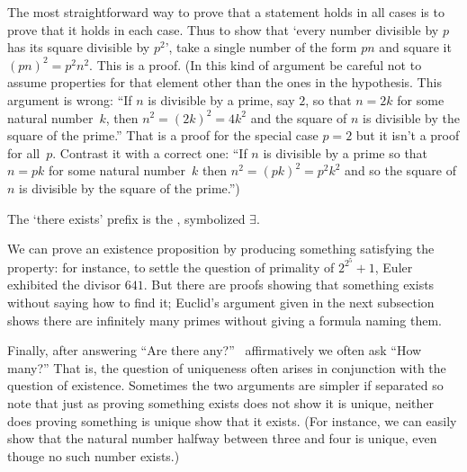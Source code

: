 The most straightforward way to prove that 
a statement holds in all cases is to 
prove that it holds in each case.
Thus to show that `every number divisible by \( p \) has its
square divisible by \( p^2 \)', take a single number of the form
\( pn \) and square it \( (pn)^2=p^2n^2 \).
This is a  proof.
(In this kind of argument be careful not to assume 
properties for that element
other than the ones in the hypothesis.
This argument is wrong:
``If \( n \) is divisible by a prime, say \( 2 \), so that \( n=2k \)
for some natural number~$k$,
then \( n^2=(2k)^2=4k^2 \) and the square of $n$ is divisible
by the square of the prime.''
That is a proof for the special case \( p=2 \) 
but it isn't a proof for all~\( p \).
Contrast it with a correct one:
``If \( n \) is divisible by a prime
so that \( n=pk \) for some natural number~$k$
then \( n^2=(pk)^2=p^2k^2 \) and so the square of $n$ is divisible
by the square of the prime.'')




The `there exists' prefix is the 
,
symbolized 
\( \exists \).


We can prove
an existence proposition by producing something satisfying
the property: for instance, to settle the question of primality of
\( 2^{2^5}+1 \), Euler exhibited the divisor \( 641 \)\cite{Sandifer}.
But there are proofs
showing that something exists without saying how to find it;
Euclid's argument given in the next subsection
shows there are infinitely many primes without giving a formula naming them.

Finally, after answering
``Are there any?''\ %
affirmatively we often ask ``How many?''
That is, the question of uniqueness often arises in conjunction
with the question of existence.
Sometimes the two arguments are simpler if separated so note that just as
proving something exists does not show it is unique,
neither does proving something is unique show that it exists.
(For instance, we can easily show that
the natural number halfway between three and four
is unique, even thouge no such number exists.)











